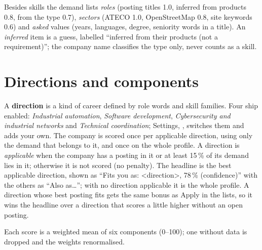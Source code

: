 \vspace{3pt}
Besides skills the demand lists \emph{roles} (posting titles 1.0, inferred from products 0.8, from the
type 0.7), \emph{sectors} (ATECO 1.0, OpenStreetMap 0.8, site keywords 0.6) and \emph{asked}
values (years, languages, degree, seniority words in a title). An \emph{inferred} item is a guess, labelled ``inferred from their products
(not a requirement)''; the company name classifies the type only, never counts as a skill.

\section{Directions and components}
A \textbf{direction} is a kind of career defined by role words and skill families. Four ship enabled:
\emph{Industrial automation}, \emph{Software development}, \emph{Cybersecurity and industrial
networks} and \emph{Technical coordination}; Settings, , switches them and adds your own. The company is scored once per applicable direction, using only the
demand that belongs to it, and once on the whole profile. A direction is \emph{applicable} when the company has a posting in it or at least 15\,\% of its demand lies in it; otherwise it is not scored (no penalty). The headline is the best applicable direction, shown as ``Fits you as:
<direction>, 78\,\% (confidence)'' with the others as ``Also as\ldots''; with no direction applicable
it is the whole profile. A direction whose best posting fits gets the same bonus as Apply in the lists, so it wins the headline over a direction that scores a little higher without an open posting.

Each score is a weighted mean of six components (0--100); one without data is dropped and the weights renormalised.

